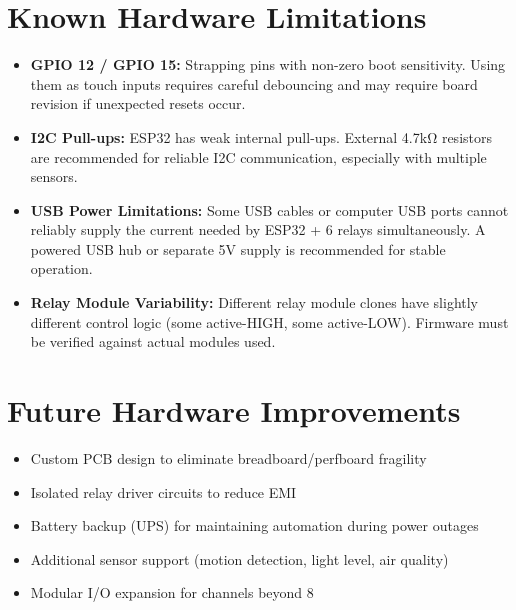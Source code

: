 \section{Known Hardware Limitations}

\begin{itemize}
    \item \textbf{GPIO 12 / GPIO 15:} Strapping pins with non-zero boot sensitivity. Using them as touch inputs requires careful debouncing and may require board revision if unexpected resets occur.
    
    \item \textbf{I2C Pull-ups:} ESP32 has weak internal pull-ups. External 4.7kΩ resistors are recommended for reliable I2C communication, especially with multiple sensors.
    
    \item \textbf{USB Power Limitations:} Some USB cables or computer USB ports cannot reliably supply the current needed by ESP32 + 6 relays simultaneously. A powered USB hub or separate 5V supply is recommended for stable operation.
    
    \item \textbf{Relay Module Variability:} Different relay module clones have slightly different control logic (some active-HIGH, some active-LOW). Firmware must be verified against actual modules used.
\end{itemize}

\section{Future Hardware Improvements}

\begin{itemize}
    \item Custom PCB design to eliminate breadboard/perfboard fragility
    \item Isolated relay driver circuits to reduce EMI
    \item Battery backup (UPS) for maintaining automation during power outages
    \item Additional sensor support (motion detection, light level, air quality)
    \item Modular I/O expansion for channels beyond 8
\end{itemize}

